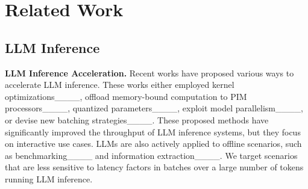 \section{Related Work}

\subsection{LLM Inference}
\textbf{LLM Inference Acceleration.}
Recent works have proposed various ways to accelerate LLM inference.
These works either employed kernel optimizations____, offload memory-bound computation to PIM processors____, quantized parameters____, exploit model parallelism____, or devise new batching strategies____.
These proposed methods have significantly improved the throughput of LLM inference systems, but they focus on interactive use cases.
LLMs are also actively applied to offline scenarios, such as benchmarking____ and information extraction____. 
We target scenarios that are less sensitive to latency factors in batches over a large number of tokens running LLM inference.



